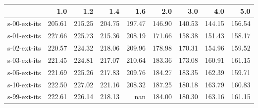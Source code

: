 \begin{tabular}{lrrrrrrrr}
\toprule
{} &    1.0 &    1.2 &    1.4 &    1.6 &    2.0 &    3.0 &    4.0 &    5.0 \\
\midrule
s-00-ext-its & 205.61 & 215.25 & 204.75 & 197.47 & 146.90 & 140.53 & 144.15 & 156.54 \\
s-01-ext-its & 227.66 & 225.73 & 215.36 & 208.19 & 171.66 & 158.38 & 151.43 & 158.17 \\
s-02-ext-its & 220.57 & 224.32 & 218.06 & 209.96 & 178.98 & 170.31 & 154.96 & 159.52 \\
s-03-ext-its & 221.45 & 224.81 & 217.07 & 210.64 & 183.36 & 173.08 & 160.91 & 161.15 \\
s-05-ext-its & 221.69 & 225.26 & 217.83 & 209.76 & 184.27 & 183.35 & 162.39 & 159.71 \\
s-10-ext-its & 222.50 & 227.02 & 221.16 & 208.32 & 187.25 & 180.18 & 163.79 & 160.83 \\
s-99-ext-its & 222.61 & 226.14 & 218.13 &    nan & 184.00 & 180.30 & 163.16 & 161.15 \\
\bottomrule
\end{tabular}
